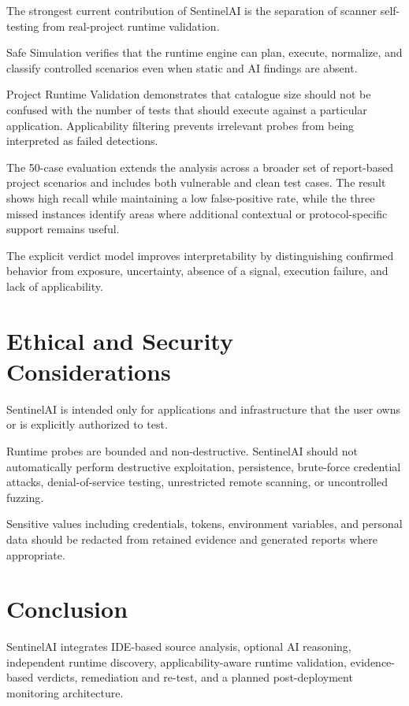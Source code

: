 \documentclass[journal]{IEEEtran}
\begin{document}
The strongest current contribution of SentinelAI is the separation of
scanner self-testing from real-project runtime validation.

Safe Simulation verifies that the runtime engine can plan, execute,
normalize, and classify controlled scenarios even when static and AI
findings are absent.

Project Runtime Validation demonstrates that catalogue size should not be
confused with the number of tests that should execute against a particular
application. Applicability filtering prevents irrelevant probes from being
interpreted as failed detections.

The 50-case evaluation extends the analysis across a broader set of report-based
project scenarios and includes both vulnerable and clean test cases. The result shows
high recall while maintaining a low false-positive rate, while the three
missed instances identify areas where additional contextual or
protocol-specific support remains useful.

The explicit verdict model improves interpretability by distinguishing
confirmed behavior from exposure, uncertainty, absence of a signal,
execution failure, and lack of applicability.

\section{Ethical and Security Considerations}

SentinelAI is intended only for applications and infrastructure that the
user owns or is explicitly authorized to test.

Runtime probes are bounded and non-destructive. SentinelAI should not
automatically perform destructive exploitation, persistence, brute-force
credential attacks, denial-of-service testing, unrestricted remote scanning,
or uncontrolled fuzzing.

Sensitive values including credentials, tokens, environment variables, and
personal data should be redacted from retained evidence and generated
reports where appropriate.

\section{Conclusion}

SentinelAI integrates IDE-based source analysis, optional AI reasoning,
independent runtime discovery, applicability-aware runtime validation,
evidence-based verdicts, remediation and re-test, and a planned
post-deployment monitoring architecture.
\end{document}

